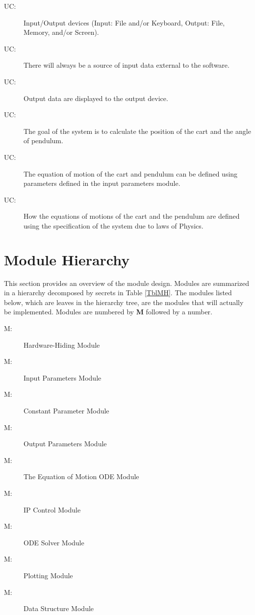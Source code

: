 \documentclass[12pt, titlepage]{article}
\newcounter{ucnum}
\newcommand{\uctheucnum}{UC\theucnum}
\newcounter{mnum}
\newcommand{\mthemnum}{M\themnum}
\begin{document}
\begin{description}
\item[ \uctheucnum \label{ucIO}:] Input/Output devices (Input: File and/or Keyboard, Output: File, Memory, and/or Screen).
\item[ \uctheucnum \label{ucInput}:] There will always be a source of input data external to the software.
\item[ \uctheucnum \label{ucOutput}:] Output data are displayed to the output device.
\item[ \uctheucnum \label{ucGoal}:] The goal of the system is to calculate the position of the cart and the angle of pendulum.
\item[ \uctheucnum \label{ucODEstructureC}:] The equation of motion of the cart and pendulum can be defined using parameters defined in the input parameters module.
\item[ \uctheucnum \label{ucEqM}:] How the equations of motions of the cart and the pendulum are defined using the specification of the system due to laws of Physics.
 
\end{description}

\section{Module Hierarchy} \label{SecMH}

This section provides an overview of the module design. Modules are summarized in a hierarchy decomposed by secrets in Table \ref{TblMH}. The modules listed below, which are leaves in the hierarchy tree, are the modules that will actually be implemented. Modules are numbered by \textbf{M} followed by a number. 

\begin{description}
\item [ \mthemnum \label{mHH}:] Hardware-Hiding Module
\item [ \mthemnum \label{mParams}:] Input Parameters Module
\item [ \mthemnum \label{mCons}:] 
Constant Parameter Module
\item [ \mthemnum \label{mOutput}:] Output Parameters Module
\item [ \mthemnum \label{mODEC}:] The Equation of Motion ODE Module

\item [ \mthemnum \label{mControl}:] IP Control Module
\item [ \mthemnum \label{mSolver}:] ODE Solver Module
\item [ \mthemnum \label{mPlot}:] Plotting Module
\item [ \mthemnum \label{mDS}:]
Data Structure Module
\end{description}
\end{document}
